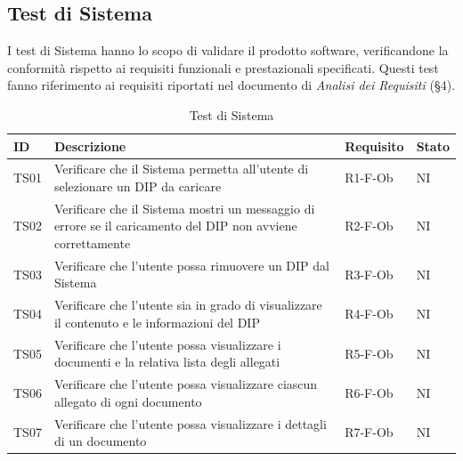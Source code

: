 \documentclass[a4paper,12pt]{article}
\begin{document}
        \subsection{Test di Sistema}

        I test di Sistema hanno lo scopo di validare il prodotto software, verificandone la conformità rispetto ai requisiti funzionali e prestazionali specificati.
        Questi test fanno riferimento ai requisiti riportati nel documento di \textit{Analisi dei Requisiti} (\S4).

            \begin{longtable}{|M{1.2cm}|M{6.3cm}|M{2.5cm}|M{1.5cm}|}
                
                \caption{Test di Sistema} \\
                \hline
                \textbf{ID} & \textbf{Descrizione} & \textbf{Requisito} & \textbf{Stato} \\
                \hline
                \endhead

                TS01 & Verificare che il Sistema permetta all'utente di selezionare un DIP da caricare & R1-F-Ob & NI \\
                \hline

                TS02 & Verificare che il Sistema mostri un messaggio di errore se il caricamento del DIP non avviene correttamente & R2-F-Ob & NI \\
                \hline

                TS03 & Verificare che l'utente possa rimuovere un DIP dal Sistema & R3-F-Ob & NI \\
                \hline

                TS04 & Verificare che l'utente sia in grado di visualizzare il contenuto e le informazioni del DIP & R4-F-Ob & NI \\
                \hline

                TS05 & Verificare che l'utente possa visualizzare i documenti e la relativa lista degli allegati & R5-F-Ob & NI \\
                \hline

                TS06 & Verificare che l'utente possa visualizzare ciascun allegato di ogni documento & R6-F-Ob & NI \\
                \hline

                TS07 & Verificare che l'utente possa visualizzare i dettagli di un documento & R7-F-Ob & NI \\
                \hline


\end{longtable}
\end{document}
